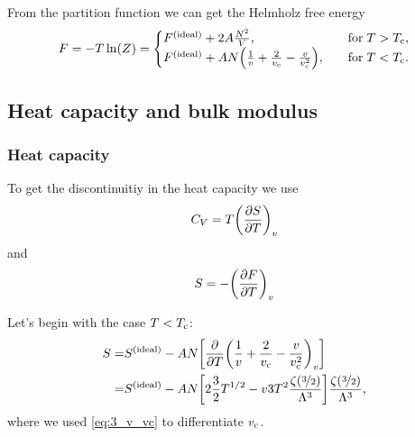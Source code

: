 \documentclass[11pt,letter, swedish, english
]{article}
\begin{document}
From the partition function we can get the Helmholz free energy
\begin{equation}
F=-T\ln(Z)=
\begin{cases}
\ideal{F}+2A\frac{N^2}{V}\qcomma &\text{for}\;T>\Tc,\\
\ideal{F}
+AN\qty(\frac{1}{v}+\frac{2}{\vc}-\frac{v}{\vc^2})
\qcomma&\text{for}\;T<\Tc.
\end{cases}
\end{equation}


\subsection{Heat capacity and bulk modulus}

\subsubsection{Heat capacity}
To get the discontinuitiy in the heat capacity we use
\begin{equation}
C_V=T\qty(\pdv{S}{T})_v
\end{equation}
and 
\begin{equation}
S=-\qty(\pdv{F}{T})_v
\end{equation}

Let's begin with the case $T<T_{\text{c}}$:
\begin{equation}
\begin{aligned}
S=&S^\text{{(ideal)}}-AN\qty[\pdv{T}\qty(\frac{1}{v}+\frac{2}{v_{\text{c}}}-\frac{v}{v_{\text{c}}^2})_v]\\
=&S^\text{{(ideal)}}-AN\qty[2\frac{3}{2}T^{1/2}-v3T^2\frac{\zeta(\nicefrac{3}{2})}{\Lambda^3}]
\frac{\zeta(\nicefrac{3}{2})}{\Lambda^3},
\end{aligned}
\end{equation}
where we used \eqref{eq:3_v_vc} to differentiate $v_{\text{c}}$.
\end{document}
